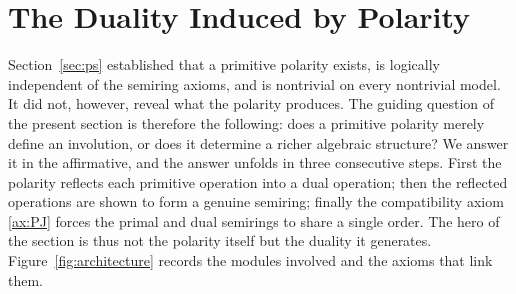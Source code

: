 
\section{The Duality Induced by Polarity}\label{sec:arch}

Section~\ref{sec:ps} established that a primitive polarity exists, is
logically independent of the semiring axioms, and is nontrivial on every
nontrivial model. It did not, however, reveal what the polarity produces.
The guiding question of the present section is therefore the following: does
a primitive polarity merely define an involution, or does it determine a
richer algebraic structure? We answer it in the affirmative, and the answer
unfolds in three consecutive steps. First the polarity reflects each
primitive operation into a dual operation; then the reflected operations are
shown to form a genuine semiring; finally the compatibility axiom
\eqref{ax:PJ} forces the primal and dual semirings to share a single order.
The hero of the section is thus not the polarity itself but the duality it
generates. Figure~\ref{fig:architecture} records the modules involved and
the axioms that link them.

\def\xunit{0.8cm}
\def\yunit{0.5cm}

